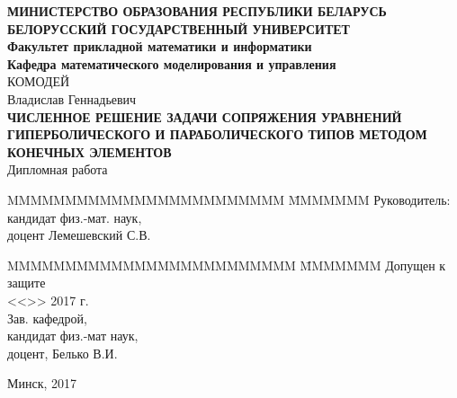 \begin{titlepage}
    \begin{center}
        \normalsize {\bf МИНИСТЕРСТВО ОБРАЗОВАНИЯ РЕСПУБЛИКИ БЕЛАРУСЬ} \\
        \vspace{0.5cm}
        \normalsize {\bf БЕЛОРУССКИЙ ГОСУДАРСТВЕННЫЙ УНИВЕРСИТЕТ} \\
        \vspace{0.5cm}
        \normalsize {\bf Факультет прикладной математики и информатики} \\
        \vspace{0.5cm}
        \normalsize {\bf Кафедра математического моделирования и управления} \\
        \vspace{2cm}
        КОМОДЕЙ \\
        Владислав Геннадьевич \\
        \vspace{1cm}
        \normalsize {\bf ЧИСЛЕННОЕ РЕШЕНИЕ ЗАДАЧИ СОПРЯЖЕНИЯ УРАВНЕНИЙ 
        ГИПЕРБОЛИЧЕСКОГО И ПАРАБОЛИЧЕСКОГО ТИПОВ МЕТОДОМ КОНЕЧНЫХ ЭЛЕМЕНТОВ}\\
        \vspace{1cm}
        \normalsize Дипломная работа \\
        \vspace{2cm}
        \begin{tabbing}
            MMMMMMMMMMMMMMMMMMMMMMMM \= MMMMMMM \kill
            \> Руководитель: \\
            \> кандидат физ.-мат. наук, \\
            \> доцент Лемешевский С.В. 
        \end{tabbing}
        \begin{tabbing}
            MMMMMMMMMMMMMMMMMMMMMMMMM \= MMMMMMM \kill
            Допущен к защите \>  \\
            <<\underline{\hspace{1cm}}>> \underline{\hspace{3.3cm}} 2017 г. \\
            Зав. кафедрой, \\ кандидат физ.-мат наук,\\
            доцент, Белько В.И.
        \end{tabbing}

        \vspace{1cm}

        \large Минск, 2017
    \end{center}
\end{titlepage}
\clearpage
\setcounter{page}{2}
